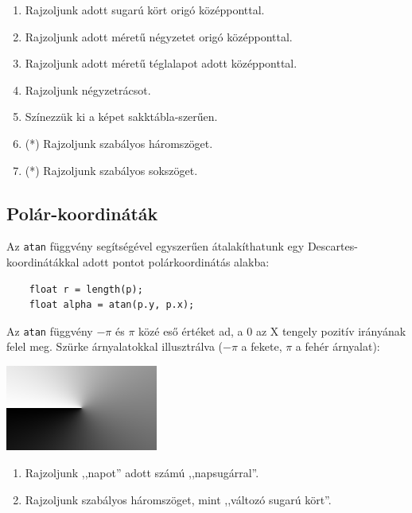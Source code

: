 \progfeladatok

\begin{enumerate}
  \item Rajzoljunk adott sugarú kört origó középponttal.
  \item Rajzoljunk adott méretű négyzetet origó középponttal.
  \item Rajzoljunk adott méretű téglalapot adott középponttal.
  \item Rajzoljunk négyzetrácsot.
  \item Színezzük ki a képet sakktábla-szerűen.
  \item (*) Rajzoljunk szabályos háromszöget.
  \item (*) Rajzoljunk szabályos sokszöget.
\end{enumerate}

\subsection{Polár-koordináták}

Az \texttt{atan} függvény segítségével egyszerűen átalakíthatunk egy Descartes-koordinátákkal adott
pontot polárkoordinátás alakba:

\begin{tcolorbox}[colback=yellow!5,colframe=yellow!50!black,title=Polárkoordináták]
  \begin{verbatim}
    float r = length(p);
    float alpha = atan(p.y, p.x);
  \end{verbatim}  
\end{tcolorbox}

Az \texttt{atan} függvény $-\pi$ és $\pi$ közé eső értéket ad, a 0 az X tengely pozitív irányának felel meg.
Szürke árnyalatokkal illusztrálva ($-\pi$ a fekete, $\pi$ a fehér árnyalat):

\includegraphics[width=5cm]{images/atan.png}

\progfeladatok

\begin{enumerate}
  \item Rajzoljunk ,,napot'' adott számú ,,napsugárral''.
  \item Rajzoljunk szabályos háromszöget, mint ,,változó sugarú kört''.
\end{enumerate}

